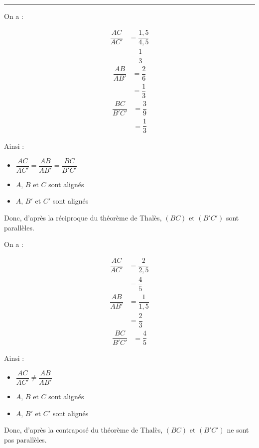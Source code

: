 \hrule \vspace{-0.5em}%
\begin{multicols}{2}
    \exo{}{} On a : \vspace{-0.5em}
    \begin{multicols}{3}
        \noindent
        \begin{align*}
            \dfrac{AC}{AC'}&=\dfrac{1,5}{4,5}\\
            &=\dfrac{1}{3}
        \end{align*}
        \begin{align*}
            \dfrac{AB}{AB'}&=\dfrac{2}{6}\\
            &=\dfrac{1}{3}
        \end{align*}
        \begin{align*}
            \dfrac{BC}{B'C'}&=\dfrac{3}{9}\\
            &=\dfrac{1}{3}
        \end{align*}
    \end{multicols}
    \vspace{-1.75em }
    Ainsi :
    \begin{itemize}
        \item $\dfrac{AC}{AC'}=\dfrac{AB}{AB'}=\dfrac{BC}{B'C'}$\vspace{0.25em}
        \item $A$, $B$ et $C$ sont alignés
        \item $A$, $B'$ et $C'$ sont alignés
    \end{itemize}
    Donc, d'après la réciproque du théorème de Thalès, $(BC)$ et $(B'C')$ sont parallèles.

    \exo{}{} On a : \vspace{-0.5em}
    \begin{multicols}{3}
        \noindent
        \begin{align*}
            \dfrac{AC}{AC'}&=\dfrac{2}{2,5}\\
            &=\dfrac{4}{5}
        \end{align*}
        \begin{align*}
            \dfrac{AB}{AB'}&=\dfrac{1}{1,5}\\
            &=\dfrac{2}{3}
        \end{align*}
        \begin{align*}
            \dfrac{BC}{B'C'}&=\dfrac{4}{5}
        \end{align*}
    \end{multicols}
    \vspace{-1.75em }
    Ainsi :
    \begin{itemize}
        \item $\dfrac{AC}{AC'}\neq\dfrac{AB}{AB'}$\vspace{0.25em}
        \item $A$, $B$ et $C$ sont alignés
        \item $A$, $B'$ et $C'$ sont alignés
    \end{itemize}
    Donc, d'après la contraposé du théorème de Thalès, $(BC)$ et $(B'C')$ ne sont pas parallèles.
\end{multicols}
